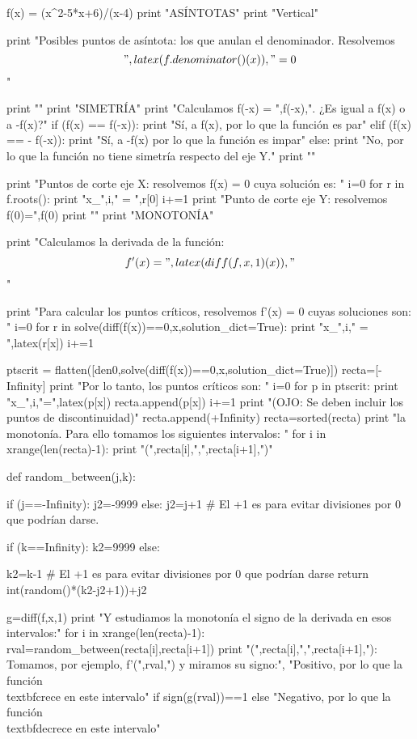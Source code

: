 
\begin{sagesilent}
f(x) = (x^2-5*x+6)/(x-4)
print "ASÍNTOTAS"
print "Vertical"

print "Posibles puntos de asíntota: los que anulan el denominador. Resolvemos \[",latex(f.denominator()(x)),"= 0\]"
    
    

print "\n\n"
print "SIMETRÍA"
print "Calculamos f(-x) = ",f(-x),". ¿Es igual a f(x) o a -f(x)?"
if (f(x) == f(-x)):
    print "Sí, a f(x), por lo que la función es par"
elif (f(x) == - f(-x)):
    print "Sí, a -f(x) por lo que la función es impar"
else:
    print "No, por lo que la función no tiene simetría respecto del eje Y."
print "\n\n"



print "Puntos de corte eje X: resolvemos f(x) = 0 cuya solución es: "
i=0
for r in f.roots():
    print "x_",i," = ",r[0]
    i+=1
print "Punto de corte eje Y: resolvemos f(0)=",f(0)
print "\n\n"
print "MONOTONÍA"

print "Calculamos la derivada de la función: \[f'(x) = ",latex(diff(f,x,1)(x)),"\]"

print "Para calcular los puntos críticos, resolvemos f'(x) = 0 cuyas soluciones son: "
i=0
for r in solve(diff(f(x))==0,x,solution_dict=True):
    print "x_",i," = ",latex(r[x])
    i+=1
   
ptscrit = flatten([den0,solve(diff(f(x))==0,x,solution_dict=True)])
recta=[-Infinity]
print "\n Por lo tanto, los puntos críticos son: "
i=0
for p in ptscrit:
    print "x_",i,"=",latex(p[x])
    recta.append(p[x])
    i+=1
print "(OJO: Se deben incluir los puntos de discontinuidad)"
recta.append(+Infinity)
recta=sorted(recta)
print "\n\nEstudiamos la monotonía. Para ello tomamos los siguientes intervalos: "
for i in xrange(len(recta)-1):
    print "(",recta[i],",",recta[i+1],")"

def random_between(j,k):
    
    if (j==-Infinity):
        j2=-9999
    else:
        j2=j+1 # El +1 es para evitar divisiones por 0 que podrían darse.
        
    if (k==Infinity):
        k2=9999
    else:        
        
        k2=k-1 # El +1 es para evitar divisiones por 0 que podrían darse
    return int(random()*(k2-j2+1))+j2

   
g=diff(f,x,1)
print "Y estudiamos la monotonía el signo de la derivada en esos intervalos:"
for i in xrange(len(recta)-1):
    rval=random_between(recta[i],recta[i+1])
    print "(",recta[i],",",recta[i+1],"): Tomamos, por ejemplo, f'(",rval,") y miramos su signo:", "Positivo, por lo que la función \\textbf{crece} en este intervalo" if sign(g(rval))==1 else "Negativo, por lo que la función \\textbf{decrece} en este intervalo"
\end{sagesilent}
